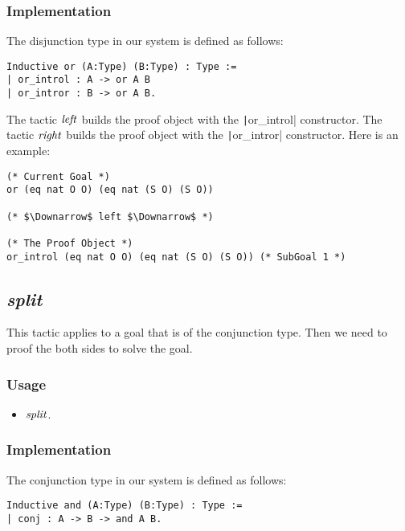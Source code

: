 \subsubsection*{Implementation}
The disjunction type in our system is defined as follows:
\begin{center}
\begin{minipage}{0.6\textwidth}
\begin{verbatim}
Inductive or (A:Type) (B:Type) : Type :=
| or_introl : A -> or A B
| or_intror : B -> or A B. 
\end{verbatim}
\end{minipage}
\end{center}

The tactic ${\it left}$ builds the proof object with the \texttt|or_introl| constructor.
The tactic ${\it right}$ builds the proof object with the \texttt|or_intror| constructor.
Here is an example:
\begin{center}
\begin{minipage}{\textwidth}
\begin{verbatim}
(* Current Goal *)
or (eq nat O O) (eq nat (S O) (S O))

(* $\Downarrow$ left $\Downarrow$ *)

(* The Proof Object *)
or_introl (eq nat O O) (eq nat (S O) (S O)) (* SubGoal 1 *)
\end{verbatim}
\end{minipage}
\end{center}

\subsection{\it split}
This tactic applies to a goal that is of the conjunction type. Then we need to proof the both sides to solve the goal.

\subsubsection*{Usage}
\begin{itemize}
\item ${\it split}$.
\end{itemize}

\subsubsection*{Implementation}
The conjunction type in our system is defined as follows:
\begin{center}
\begin{minipage}{0.6\textwidth}
\begin{verbatim}
Inductive and (A:Type) (B:Type) : Type :=
| conj : A -> B -> and A B.   
\end{verbatim}
\end{minipage}
\end{center}

